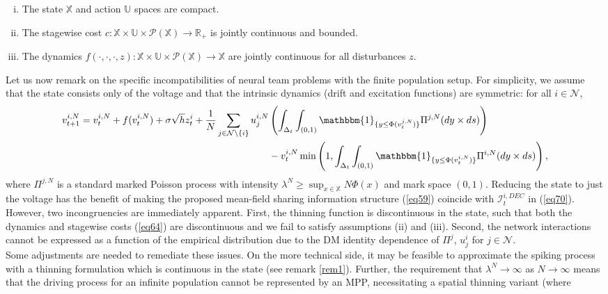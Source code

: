 \documentclass[12pt, oneside]{report}
\newcommand{\mbb}[1]{\mathbb{#1}}
\newcommand{\1}[1]{\mathbbm{1}_{\{#1\}}}
\newcommand{\mc}[1]{\mathcal{#1}}
\theoremstyle{definition}
\begin{document}
\begin{enumerate}[(i)]
    \item The state $\mbb{X}$ and action $\mbb{U}$ spaces are compact.
    \item The stagewise cost
    $c:\mbb{X}\times\mbb{U}\times\mc{P}(\mbb{X})\rightarrow\mbb{R}_+$ is jointly
    continuous and bounded.
    \item The dynamics
    $f(\cdot,\cdot,\cdot,z):\mbb{X}\times\mbb{U}\times\mc{P}(\mbb{X})\rightarrow\mbb{X}$
    are jointly continuous for all disturbances $z$.
\end{enumerate}

\indent Let us now remark on the specific incompatibilities of neural team
problems with the finite population setup. For simplicity, we assume that the
state consists only of the voltage and that the intrinsic dynamics (drift and
excitation functions) are symmetric: for all $i\in\mc{N}$,
\begin{align}
    v^{i,N}_{t+1}=v^{i,N}_t+f(v^{i,N}_t)+\sigma\sqrt{h}z^i_t+\frac{1}{N}\sum_{j\in\mc{N}\setminus\{i\}}u^{i,N}_j&\left(\int_{\Delta_t}\int_{(0,1)}\1{y\leq \Phi(v^{j,N}_t)}\Pi^{j,N}(dy\times ds)\right)\notag\\
    &-v^{i,N}_t\min\left(1,\int_{\Delta_t}\int_{(0,1)}\1{y\leq\Phi(v^{i,N}_t)}\Pi^{i,N}(dy\times ds)\right),\label{eq72}
\end{align}
where $\Pi^{j,N}$ is a standard marked Poisson process with intensity
$\lambda^N\geq\sup_{x\in\mbb{X}}N\Phi(x)$ and mark space $(0,1)$. Reducing the
state to just the voltage has the benefit of making the proposed mean-field
sharing information structure (\ref{eq59}) coincide with $\mc{I}^{i,DEC}_t$ in
(\ref{eq70}). However, two incongruencies are immediately apparent. First, the
thinning function is discontinuous in the state, such that both the dynamics and
stagewise costs (\ref{eq64}) are discontinuous and we fail to satisfy
assumptions (ii) and (iii). Second, the network interactions cannot be expressed
as a function of the empirical distribution due to the DM identity dependence of
$\Pi^j$, $u^i_j$ for $j\in\mc{N}$.\\[5pt]
\indent Some adjustments are needed to remediate these issues. On the more
technical side, it may be feasible to approximate the spiking process with a
thinning formulation which is continuous in the state (see remark \ref{rem1}).
Further, the requirement that $\lambda^N\rightarrow\infty$ as
$N\rightarrow\infty$ means that the driving process for an infinite population
cannot be represented by an MPP, necessitating a spatial thinning variant (where
\end{document}
